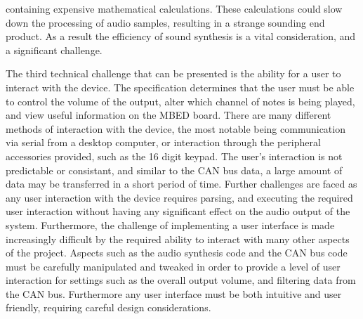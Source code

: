 containing expensive mathematical calculations. 
These calculations could slow down the processing of audio samples, resulting in
a strange sounding end product. As a result the efficiency of sound synthesis is 
a vital consideration, and a significant challenge. 
\par\bigskip\noindent
The third technical challenge that can be presented is the ability for a user 
to interact with the device.
The specification determines that the user must be able to control 
the volume of the output, alter which channel of notes is being played, 
and view useful information on the MBED board. 
There are many different methods of interaction with the device, the most 
notable being communication via serial from a desktop computer, or interaction 
through the peripheral accessories provided, such as the 16 digit keypad. 
The user's interaction is not predictable or consistant, and similar to the CAN 
bus data, a large amount of data may be transferred in a short period of time. 
Further challenges are faced as any user interaction with the device requires 
parsing, and executing the required user interaction without having any 
significant effect on the audio output of the system.
Furthermore, the challenge of implementing a user interface is made increasingly 
difficult by the required ability to interact with many other aspects of the 
project. 
Aspects such as the audio synthesis code and the CAN bus code must be carefully 
manipulated and tweaked in order to provide a level of user interaction for 
settings such as the overall output volume, and filtering data from the CAN bus. 
Furthermore any user interface must be both intuitive and user friendly, requiring
careful design considerations. 
